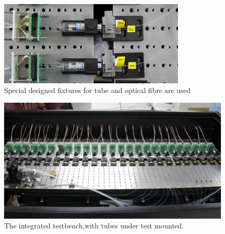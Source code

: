 \documentclass[5p, times]{elsarticle}
\begin{document}
\begin{figure}[h!]
 \centering
 \includegraphics[width=90mm]{fixtures1_crop}
\caption{Special designed fixtures for tube and optical fibre are used}
\label{fig:fixture}
\end{figure}

\begin{figure}[t]
 \centering
 \includegraphics[width=140mm]{integration1_crop}
\caption{The integrated testbench,with tubes under test mounted.}
\label{fig:testbench_integrated}
\end{figure}
  
\end{document}
